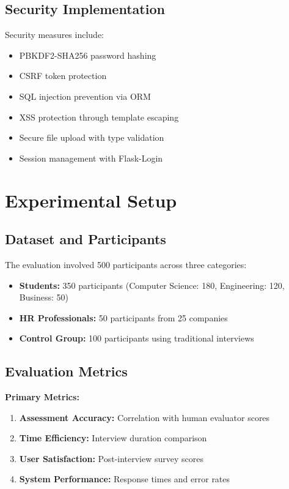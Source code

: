 \documentclass[conference]{IEEEtran}
\begin{document}
\subsection{Security Implementation}

Security measures include:
\begin{itemize}
\item PBKDF2-SHA256 password hashing
\item CSRF token protection
\item SQL injection prevention via ORM
\item XSS protection through template escaping
\item Secure file upload with type validation
\item Session management with Flask-Login
\end{itemize}

\section{Experimental Setup}

\subsection{Dataset and Participants}

The evaluation involved 500 participants across three categories:
\begin{itemize}
\item \textbf{Students:} 350 participants (Computer Science: 180, Engineering: 120, Business: 50)
\item \textbf{HR Professionals:} 50 participants from 25 companies
\item \textbf{Control Group:} 100 participants using traditional interviews
\end{itemize}

\subsection{Evaluation Metrics}

\textbf{Primary Metrics:}
\begin{enumerate}
\item \textbf{Assessment Accuracy:} Correlation with human evaluator scores
\item \textbf{Time Efficiency:} Interview duration comparison
\item \textbf{User Satisfaction:} Post-interview survey scores
\item \textbf{System Performance:} Response times and error rates
\end{enumerate}
\end{document}
